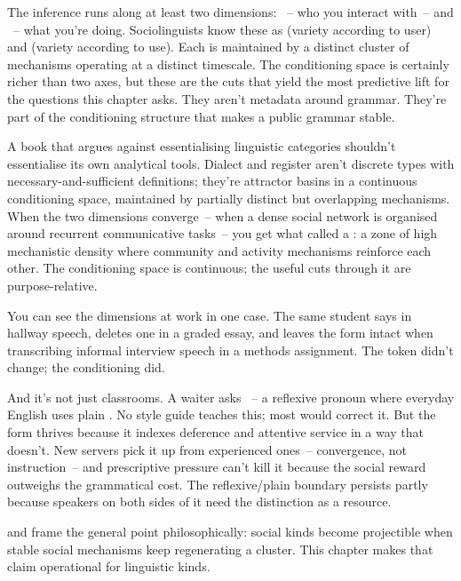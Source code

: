 The inference runs along at least two dimensions: ~-- who you interact with~-- and ~-- what you're doing. Sociolinguists know these as  (variety according to user) and  (variety according to use). Each is maintained by a distinct cluster of mechanisms operating at a distinct timescale. The conditioning space is certainly richer than two axes, but these are the cuts that yield the most predictive lift for the questions this chapter asks. They aren't metadata around grammar. They're part of the conditioning structure that makes a public grammar stable.

A book that argues against essentialising linguistic categories shouldn't essentialise its own analytical tools. Dialect and register aren't discrete types with necessary-and-sufficient definitions; they're attractor basins in a continuous conditioning space, maintained by partially distinct but overlapping mechanisms. When the two dimensions converge~-- when a dense social network is organised around recurrent communicative tasks~-- you get what \textcite{swales1990} called a : a zone of high mechanistic density where community and activity mechanisms reinforce each other. The conditioning space is continuous; the useful cuts through it are purpose-relative.

You can see the dimensions at work in one case. The same student says  in hallway speech, deletes one  in a graded essay, and leaves the form intact when transcribing informal interview speech in a methods assignment. The token didn't change; the conditioning did.

And it's not just classrooms. A waiter asks ~-- a reflexive pronoun where everyday English uses plain . No style guide teaches this; most would correct it. But the form thrives because it indexes deference and attentive service in a way that  doesn't. New servers pick it up from experienced ones~-- convergence, not instruction~-- and prescriptive pressure can't kill it because the social reward outweighs the grammatical cost. The reflexive/plain boundary persists partly because speakers on both sides of it need the distinction as a resource.

\textcite{mallon2003} and \textcite{khalidi2015three} frame the general point philosophically: social kinds become projectible when stable social mechanisms keep regenerating a cluster. This chapter makes that claim operational for linguistic kinds.

